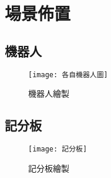 \chapter{場景佈置}
\section{機器人}
\begin{figure}[hbt!]
\begin{center}
\label{各自機器人圖}
\texttt{[image: 各自機器人圖]}
\caption{\Large 機器人繪製}
\end{center}
\end{figure}

\section{記分板}
\begin{figure}[hbt!]
\begin{center}
\label{記分板}
\texttt{[image: 記分板]}
\caption{\Large 記分板繪製}
\end{center}
\end{figure}
